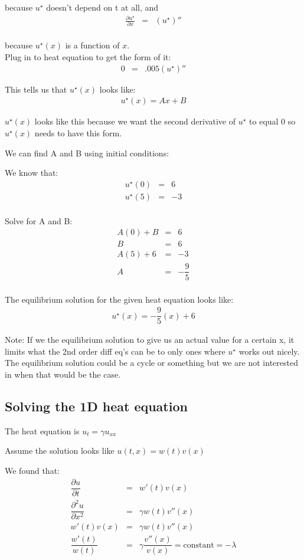 \documentclass{article}
\newcommand{\bea}{\begin{eqnarray*}}
\newcommand{\eea}{\end{eqnarray*}}
\newcommand{\blue}[1]{\textcolor{blue}{#1}}
\begin{document}
because $u^{\star}$ doesn't depend on t at all, and 
\bea
\frac{\partial u^{\star} }{\partial x} &=& (u^{\star})'' \\
\eea

because $u^{\star}(x)$ is a function of $x$.\\

Plug in to heat equation to get the form of it:
\bea
0 &=& .005(u^{\star})''
\eea

This tells us that $u^{\star}(x)$ looks like:
\bea
u^{\star}(x) = Ax + B
\eea

$u^{\star}(x)$ looks like this because we want the second derivative of $u^{\star}$ to equal 0 so $u^{\star}(x)$ needs to have this form. 

We can find A and B using initial conditions:

We know that:
\bea
u^{\star}(0) &=& 6 \\
u^{\star}(5) &=& -3 \\
\eea

Solve for A and B:
\bea
A(0) + B &=& 6\\
B &=& 6 \\
A(5) + 6 &=& -3 \\
A &=& -\dfrac{9}{5} \\
\eea

The equilibrium solution for the given heat equation looks like:
\bea
u^{\star}(x)=-\dfrac{9}{5}(x) + 6
\eea

Note: If we the equilibrium solution to give us an actual value for a certain x, it limits what the 2nd order diff eq's can be to only ones where $u^{\star}$ works out nicely. The equilibrium solution could be a cycle or something but we are not interested in when that would be the case. 

\subsection{Solving the 1D heat equation}
The heat equation is $u_t = \gamma u_{xx}$

Assume the solution looks like $u(t,x) = w(t)v(x)$

We found that:
\bea
\dfrac{\partial u}{\partial t} &=& w'(t)v(x) \\
\dfrac{\partial^2 u}{\partial x^2} &=& \gamma w(t)v''(x) \\
w'(t)v(x) &=& \gamma w(t)v''(x) \\
\dfrac{w'(t)}{w(t)} &=& \gamma \dfrac{v''(x)}{v(x)} = \mbox{constant} = -\lambda
\eea
\end{document}
